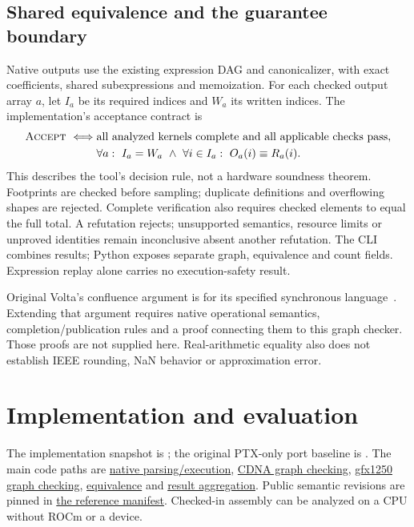\documentclass[10pt,letterpaper]{article}
\newcommand{\code}[1]{\texttt{\detokenize{#1}}}
\newcommand{\repo}[2]{\href{https://github.com/harsh-nod/ptx_verifier/blob/32bce31b15cd80ad64ccf92cfefb46d73a3815ab/#1}{#2}}
\newcommand{\accept}{\textsc{Accept}}
\begin{document}
\subsection{Shared equivalence and the guarantee boundary}

Native outputs use the existing expression DAG and canonicalizer, with exact
coefficients, shared subexpressions and memoization. For each checked output
array \(a\), let \(I_a\) be its required indices and \(W_a\) its written indices.
The implementation's acceptance contract is
\[
\begin{split}
\accept\ \Longleftrightarrow\;&\text{all analyzed kernels complete and all applicable checks pass,}\\
&\forall a:\ I_a=W_a\ \land\ \forall i\in I_a:\ O_a(i)\equiv R_a(i).
\end{split}
\]
This describes the tool's decision rule, not a hardware soundness theorem.
Footprints are checked before sampling; duplicate definitions and overflowing
shapes are rejected. Complete verification also requires checked elements to
equal the full total. A refutation rejects; unsupported semantics, resource
limits or unproved identities remain inconclusive absent another refutation.
The CLI combines results; Python exposes separate graph, equivalence and count
fields. Expression replay alone carries no execution-safety result.

Original Volta's confluence argument is for its specified synchronous
language~\cite{volta}. Extending that argument requires native operational
semantics, completion/publication rules and a proof connecting them to this
graph checker. Those proofs are not supplied here. Real-arithmetic equality
also does not establish IEEE rounding, NaN behavior or approximation error.

\section{Implementation and evaluation}

The implementation snapshot is \code{f0ee442}; the original PTX-only port baseline
is \code{e8f8199}. The main code paths are
\repo{crates/volta_amdgpu_analysis/README.md}{native parsing/execution},
\repo{crates/volta_graph_check/src/amdgpu.rs}{CDNA graph checking},
\repo{crates/volta_graph_check/src/amdgpu/gfx1250.rs}{gfx1250 graph checking},
\repo{crates/volta_equivalence/README.md}{equivalence} and
\repo{crates/volta_pipeline/README.md}{result aggregation}.
Public semantic revisions are pinned in
\repo{tests/gfx1250/fixtures/semantic-references.json}{the reference manifest}.
Checked-in assembly can be analyzed on a CPU without ROCm or a device.
\end{document}
